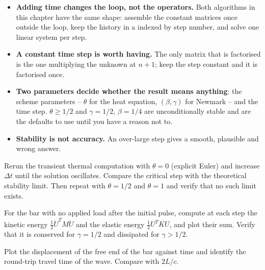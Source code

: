 
\begin{gbox*}
\begin{itemize}
  \item \textbf{Adding time changes the loop, not the operators.} Both
  algorithms in this chapter have the same shape: assemble the constant
  matrices once outside the loop, keep the history in a  indexed
  by step number, and solve one linear system per step.
  \item \textbf{A constant time step is worth having.} The only matrix that
  is factorised is the one multiplying the unknown at $n+1$; keep the step
  constant and it is factorised once.
  \item \textbf{Two parameters decide whether the result means anything}:
  the scheme parameters -- $\theta$ for the heat equation,
  $(\beta,\gamma)$ for Newmark -- and the time step. $\theta\ge1/2$ and
  $\gamma=1/2$, $\beta=1/4$ are unconditionally stable and are the defaults
  to use until you have a reason not to.
  \item \textbf{Stability is not accuracy.} An over-large step gives a
  smooth, plausible and wrong answer.
\end{itemize}
\end{gbox*}


 Rerun the transient thermal
  computation with $\theta=0$ (explicit Euler) and increase $\Delta t$ until
  the solution oscillates. Compare the critical step with the theoretical
  stability limit. Then repeat with $\theta=1/2$ and $\theta=1$ and verify
  that no such limit exists.

 For the bar with no applied
  load after the initial pulse, compute at each step the kinetic energy
  $\tfrac12 \dot{U}^{T}M\dot{U}$ and the elastic energy
  $\tfrac12 U^{T}KU$, and plot their sum. Verify that it is conserved for
  $\gamma=1/2$ and dissipated for $\gamma>1/2$.

 Plot the displacement of the free end of the
  bar against time and identify the round-trip travel time of the wave.
  Compare with $2L/c$.
